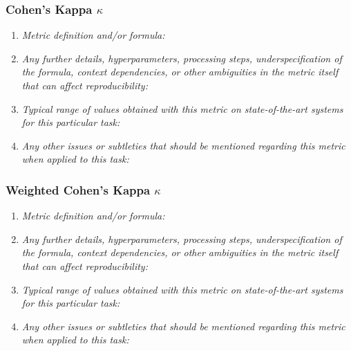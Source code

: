 \documentclass[a4paper,11pt]{article}
\begin{document}
        \subsubsection{Cohen's Kappa $\kappa$}
            \begin{enumerate}[label=\alph*.]
                \item \textit{Metric definition and/or formula:}
                \bigskip
                \item \textit{Any further details, hyperparameters, processing steps, underspecification of the formula, context dependencies, or other ambiguities in the metric itself that can affect reproducibility:}
                \bigskip
                \item \textit{Typical range of values obtained with this metric on state-of-the-art systems for this particular task:}
                \bigskip
                \item \textit{Any other issues or subtleties that should be mentioned regarding this metric when applied to this task:}
                \bigskip
            \end{enumerate}
        \subsubsection{Weighted Cohen's Kappa $\kappa$}
            \begin{enumerate}[label=\alph*.]
                \item \textit{Metric definition and/or formula:}
                \bigskip
                \item \textit{Any further details, hyperparameters, processing steps, underspecification of the formula, context dependencies, or other ambiguities in the metric itself that can affect reproducibility:}
                \bigskip
                \item \textit{Typical range of values obtained with this metric on state-of-the-art systems for this particular task:}
                \bigskip
                \item \textit{Any other issues or subtleties that should be mentioned regarding this metric when applied to this task:}
                \bigskip
            \end{enumerate}
\end{document}
